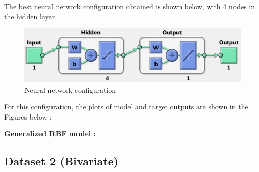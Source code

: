 \documentclass{article}
\begin{document}
The best neural network configuration obtained is shown below, with 4 nodes in the hidden layer.



\begin{figure}[H]
\centering
\includegraphics[width=\linewidth]{Regression/univariate/net_config.png}
\caption{Neural network configuration}
\end{figure}

For this configuration, the plots of model and target outputs are shown in the Figures below : 


\textbf{Generalized RBF model :}

\subsection{Dataset 2 (Bivariate)}




%
%
\end{document}
